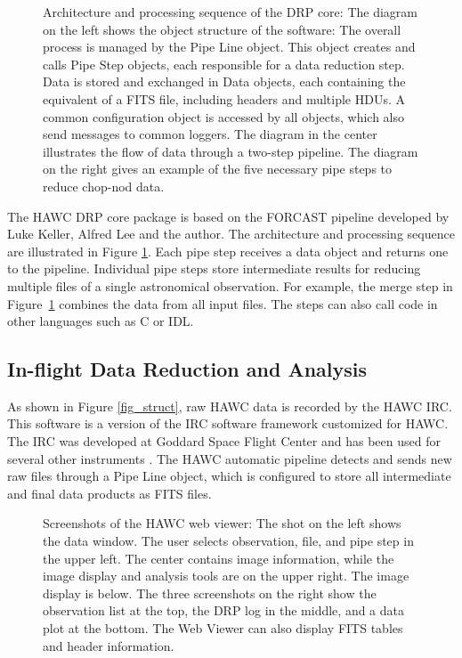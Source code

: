 \begin{figure}[!ht]
\begin{minipage}{\textwidth}
\end{minipage}

\caption{Architecture and processing sequence of the DRP core: The diagram on the left shows the object structure of the software: The overall process is managed by the Pipe Line object. This object creates and calls Pipe Step objects, each responsible for a data reduction step. Data is stored and exchanged in Data objects, each containing the equivalent of a FITS file, including headers and multiple HDUs. A common configuration object is accessed by all objects, which also send messages to common loggers. The diagram in the center illustrates the flow of data through a two-step pipeline. The diagram on the right gives an example of the five necessary pipe steps to reduce chop-nod data.}

\label{fig_core}
\end{figure}

The HAWC DRP core package is based on the FORCAST pipeline developed by Luke Keller, Alfred Lee and the author. The architecture and processing sequence are illustrated in Figure \ref{fig_core}. Each pipe step receives a data object and returns one to the pipeline. Individual pipe steps store
intermediate results for reducing multiple files of a single astronomical observation. For example, the merge step in Figure~\ref{fig_core} combines the data from all input files. The steps can also call code in other languages such as C or IDL.

\subsection{In-flight Data Reduction and Analysis}

As shown in Figure \ref{fig_struct}, raw HAWC data is recorded by the HAWC IRC. This software is a version of the IRC software framework customized for HAWC. The IRC was developed at Goddard Space Flight Center and has been used for several other instruments \citep[see][]{staguhn06}. The HAWC automatic pipeline detects and sends new raw files through a Pipe Line object, which is configured to store all intermediate and final data products as FITS files.

\begin{figure}[!ht]

\caption{Screenshots of the HAWC web viewer: The shot on the left shows the data window. The user selects observation, file, and pipe step in the upper left. The center contains image information, while the image display and analysis tools are on the upper right. The image display is below. The three screenshots on the right show the observation list at the top, the DRP log in the middle, and a data plot at the bottom. The Web Viewer can also display FITS tables and header information.}

\label{fig_screen}

\end{figure}

